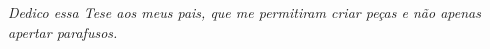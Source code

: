 \begin{dedicatoria}
   \vspace*{\fill}
   \centering
   \noindent
   \textit{Dedico essa Tese aos meus pais, que me permitiram criar peças e não apenas apertar parafusos.} \vspace*{\fill}
\end{dedicatoria}

